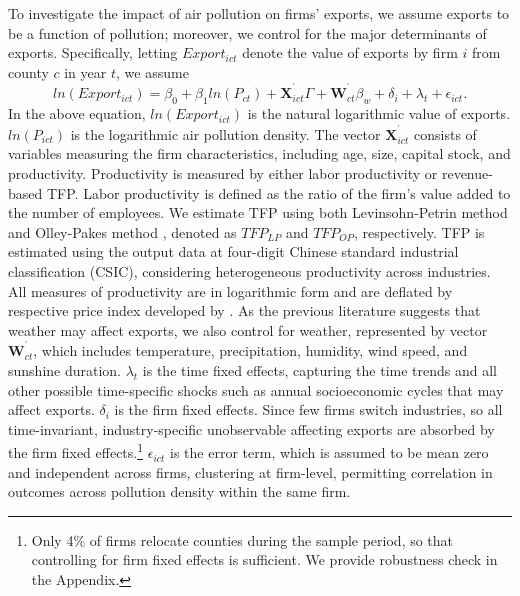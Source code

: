 \documentclass[12pt]{article}
\begin{document}
To investigate the impact of air pollution on firms' exports, we assume
exports to be a function of pollution; moreover, we control for the major
determinants of exports. Specifically, letting $Export_{ict}$
denote the value of exports by firm $i$ from county $c$ in year $t$, we
assume 
\begin{equation}
ln(Export_{ict})=\beta _{0}+\beta _{1}ln(P_{ct})+\mathbf{X}%
_{ict}^{^{\prime }}\Gamma +\mathbf{W}_{ct}^{^{\prime }}\beta _{w}+\delta
_{i}+\lambda _{t}+\epsilon _{ict}.  \label{equ1}
\end{equation}%
In the above equation, $ln(Export_{ict})$ is the natural
logarithmic value of exports. $ln(P_{ict})$ is the logarithmic air
pollution density. The vector $\mathbf{X}_{ict}^{^{\prime }}$ consists of
variables measuring the firm characteristics, including age, size,
capital stock, and productivity. Productivity is measured by either labor
productivity or revenue-based TFP. Labor productivity is defined as the
ratio of the firm's value added to the number of employees. We estimate TFP
using both Levinsohn-Petrin method \citep{levinsohn2003estimating} and
Olley-Pakes method \citep{olley1996dynamics}, denoted as $TFP_{LP}$ and $%
TFP_{OP}$, respectively. TFP is estimated using the output data at four-digit
Chinese standard industrial classification (CSIC), considering heterogeneous
productivity across industries. All measures of productivity are in
logarithmic form and are deflated by respective price index developed by %
\citep{brandt2017wto}. As the previous literature %
\citep[e.g.,][]{jones2010climate} suggests that weather may affect exports,
we also control for weather, represented by vector $\mathbf{W}%
_{ct}^{^{\prime}}$, which includes temperature, precipitation, humidity,
wind speed, and sunshine duration. $\lambda _{t}$ is the time fixed effects,
capturing the time trends and all other possible time-specific shocks such
as annual socioeconomic cycles that may affect exports. $\delta _{i}$ is the
firm fixed effects. Since few
firms switch industries, so all time-invariant, industry-specific
unobservable affecting exports are absorbed by the firm fixed effects.\footnote{Only 4\% of firms relocate counties during the sample period, so that controlling for firm fixed effects is sufficient. We provide robustness check in the Appendix.}
$\epsilon _{ict}$ is
the error term, which is assumed to be mean zero and independent across
firms, clustering at firm-level, permitting correlation in outcomes across pollution density
within the same firm.
\end{document}
